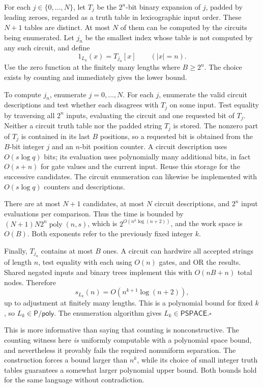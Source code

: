 \documentclass[11pt]{article}
\begin{document}
For each $j\in\{0,\ldots,N\}$, let $T_j$ be the $2^n$-bit binary expansion
of $j$, padded by leading zeroes, regarded as a truth table in lexicographic
input order. These $N+1$ tables are distinct. At most $N$ of them can be
computed by the circuits being enumerated. Let $j_n$ be the smallest index
whose table is not computed by any such circuit, and define
\[
                     1_{L_k}(x)=T_{j_n}[x]
                    \qquad(|x|=n).
\]
Use the zero function at the finitely many lengths where $B\ge2^n$.
The choice exists by counting and immediately gives the lower bound.

To compute $j_n$, enumerate $j=0,\ldots,N$. For each $j$, enumerate the
valid circuit descriptions and test whether each disagrees with $T_j$ on
some input. Test equality by traversing all $2^n$ inputs, evaluating the
circuit and one requested bit of $T_j$. Neither a circuit truth table nor
the padded string $T_j$ is stored. The nonzero part of $T_j$ is contained
in its last $B$ positions, so a requested bit is obtained from the $B$-bit
integer $j$ and an $n$-bit position counter. A circuit description uses
$O(s\log q)$ bits; its evaluation uses polynomially many additional bits,
in fact $O(s+n)$ for gate values and the current input. Reuse this storage
for the successive candidates. The circuit enumeration can likewise be
implemented with $O(s\log q)$ counters and descriptions.

There are at most $N+1$ candidates, at most $N$ circuit descriptions,
and $2^n$ input evaluations per comparison. Thus the time is bounded by
$(N+1)N2^n\operatorname{poly}(n,s)$, which is
$2^{O(n^k\log(n+2))}$, and the work space is $O(B)$. Both exponents refer
to the previously fixed integer $k$.

Finally, $T_{j_n}$ contains at most $B$ ones. A circuit can hardwire all
accepted strings of length $n$, test equality with each using $O(n)$ gates,
and OR the results. Shared negated inputs and binary trees implement this
with $O(nB+n)$ total nodes. Therefore
\begin{equation}\label{a12:upper}
                s_{L_k}(n)=O(n^{k+1}\log(n+2)),
\end{equation}
up to adjustment at finitely many lengths. This is a polynomial bound for
fixed $k$, so $L_k\in\mathsf{P/poly}$. The enumeration algorithm gives
$L_k\in\mathsf{PSPACE}$.\hfill$\square$

This is more informative than saying that counting is nonconstructive.
The counting witness here \emph{is} uniformly computable with a polynomial
space bound, and nevertheless it provably fails the required nonuniform
separation. The construction forces a bound larger than $n^k$, while its
choice of small integer truth tables guarantees a somewhat larger polynomial
upper bound. Both bounds hold for the same language without contradiction.
\end{document}
